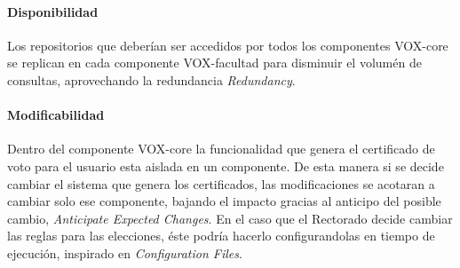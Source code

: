\paragraph{Disponibilidad}
Los repositorios que deberían ser accedidos por todos los componentes VOX-core se replican en cada componente VOX-facultad para disminuir el volumén de consultas, aprovechando la redundancia \textit{Redundancy}.

\paragraph{Modificabilidad}
Dentro del componente VOX-core la funcionalidad que genera el certificado de voto para el usuario esta aislada en un componente. De esta manera si se decide cambiar el sistema que genera los certificados, las modificaciones se acotaran a cambiar solo ese componente, bajando el impacto gracias al anticipo del posible cambio, \textit{Anticipate Expected Changes}. En el caso que el Rectorado decide cambiar las reglas para las elecciones, éste podría hacerlo configurandolas en tiempo de ejecución, inspirado en \textit{Configuration Files}.


